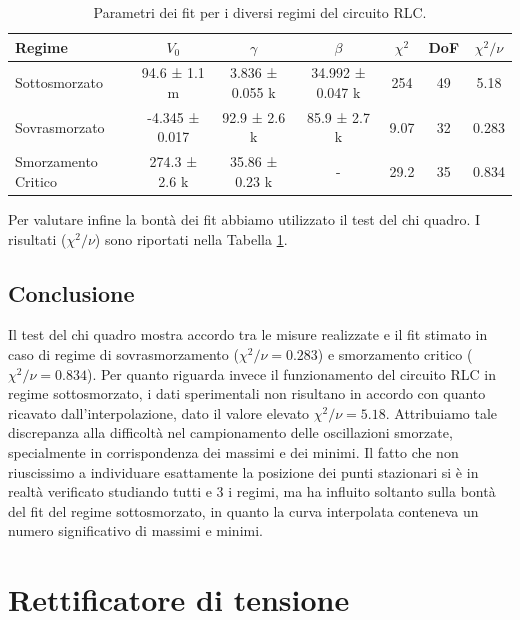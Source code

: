 \documentclass[a4paper]{article}
\begin{document}
\begin{center}
    \label{fig: rlc critico}
\end{center}

\begin{table}[htbp]
\centering
\begin{tabular}{|l|cccccc|} %
\hline
Regime & $V_0$ & $\gamma$ & $\beta$ & $\chi^2$ & DoF & $\chi^2/\nu$ \\
\hline\hline
Sottosmorzato       & 94.6 ± 1.1 m     & 3.836 ± 0.055 k & 34.992 ± 0.047 k & 254  & 49 & 5.18  \\
Sovrasmorzato       & -4.345 ± 0.017   & 92.9 ± 2.6 k    & 85.9 ± 2.7 k     & 9.07 & 32 & 0.283 \\
Smorzamento Critico & 274.3 ± 2.6 k    & 35.86 ± 0.23 k  & -                & 29.2 & 35 & 0.834 \\ %
\hline
\end{tabular}
\caption{Parametri dei fit per i diversi regimi del circuito RLC.}
\label{tab:rlc_fit_results} %
\end{table}

Per valutare infine la bontà dei fit abbiamo utilizzato il test del chi quadro. I risultati ($\chi^2/\nu$) sono riportati nella Tabella \ref{tab:rlc_fit_results}.

\subsection{Conclusione}
Il test del chi quadro mostra accordo tra le misure realizzate e il fit stimato in caso di regime di sovrasmorzamento ($\chi^2/\nu = 0.283$) e smorzamento critico ($\chi^2/\nu = 0.834$). Per quanto riguarda invece il funzionamento del circuito RLC in regime sottosmorzato, i dati sperimentali non risultano in accordo con quanto ricavato dall'interpolazione, dato il valore elevato $\chi^2/\nu = 5.18$. Attribuiamo tale discrepanza alla difficoltà nel campionamento delle oscillazioni smorzate, specialmente in corrispondenza dei massimi e dei minimi. Il fatto che non riuscissimo a individuare esattamente la posizione dei punti stazionari si è in realtà verificato studiando tutti e 3 i regimi, ma ha influito soltanto sulla bontà del fit del regime sottosmorzato, in quanto la curva interpolata conteneva un numero significativo di massimi e minimi.


\section{Rettificatore di tensione}
\end{document}
